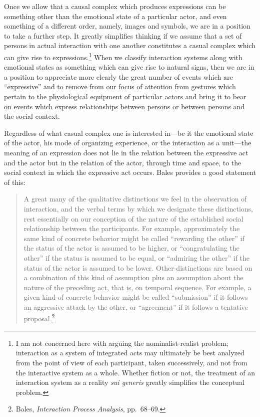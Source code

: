 \documentclass[twoside,symmetric,nobib,justified]{tufte-book}
\begin{document}
Once we allow that a causal complex which produces expressions can be
something other than the emotional state of a particular actor, and even
something of a different order, namely, images and symbols, we are in a
position to take a further step. It greatly simplifies thinking if we
assume that a set of persons in actual interaction with one another
constitutes a casual complex which can give rise to
expressions.\footnote{I am not concerned here with arguing the
  nominalist-realist problem; interaction as a system of integrated acts
  may ultimately be best analyzed from the point of view of each
  participant, taken successively, and not from the interactive system
  as a whole. Whether fiction or not, the treatment of an interaction
  system as a reality \emph{sui generis} greatly simplifies the
  conceptual problem.} When we classify interaction systems along with
emotional states as something which can give rise to natural signs, then
we are in a position to appreciate more clearly the great number of
events which are ``expressive'' and to remove from our focus of
attention from gestures which pertain to the physiological equipment of
particular actors and bring it to bear on events which express
relationships between persons or between persons and the social context.

Regardless of what casual complex one is interested in---be it the
emotional state of the actor, his mode of organizing experience, or the
interaction as a unit---the meaning of an expression does not lie in the
relation between the expressive act and the actor but in the relation of
the actor, through time and space, to the social context in which the
expressive act occurs. Bales provides a good statement of this:

\begin{quote}
A great many of the qualitative distinctions we feel in the observation
of interaction, and the verbal terms by which we designate these
distinctions, rest essentially on our conception of the nature of the
established social relationship between the participants. For example,
approximately the same kind of concrete behavior might be called
``rewarding the other'' if the status of the actor is assumed to be
higher, or ``congratulating the other'' if the status is assumed to be
equal, or ``admiring the other'' if the status of the actor is assumed
to be lower. Other-distinctions are based on a combination of this kind
of assumption plus an assumption about the nature of the preceding act,
that is, on temporal sequence. For example, a given kind of concrete
behavior might be called ``submission'' if it follows an aggressive
attack by the other, or ``agreement'' if it follows a tentative
proposal.\footnote{Bales, \emph{Interaction Process Analysis},
  pp.~68--69.}
\end{quote}
\end{document}
